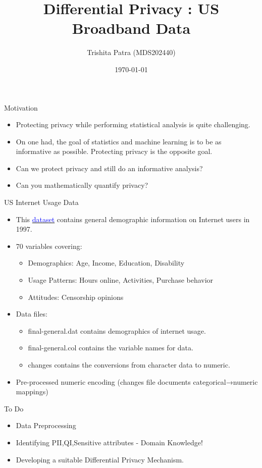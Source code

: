 \documentclass{beamer}
\title{Differential Privacy : US Broadband Data}
\author{Trishita Patra (MDS202440)}
\institute{Chennai Mathematical Institution}
\date{\today}
\begin{document}
\frame{\titlepage}

\begin{frame}{ Motivation}
\begin{itemize}
    \item Protecting privacy while performing statistical analysis is quite challenging. 
    \item On one had, the goal of statistics and machine learning is to be as informative as possible. Protecting privacy is the opposite goal.  
    \item Can we protect privacy and still do an informative analysis?
    \item Can you mathematically quantify privacy?
\end{itemize}
\end{frame}


\begin{frame}{US Internet Usage Data}
\begin{itemize}
    \item This \href{https://archive.ics.uci.edu/dataset/126/internet+usage+data}{\textcolor{blue}{dataset}} contains general demographic information on Internet users in 1997.
    \item 70 variables covering:
    \begin{itemize}
        \item Demographics: Age, Income, Education, Disability
        \item Usage Patterns: Hours online, Activities, Purchase behavior
        \item Attitudes: Censorship opinions
    \end{itemize}
    \item Data files:
    \begin{itemize}
        \item final-general.dat contains demographics of internet usage.
        \item final-general.col contains the variable names for data.
        \item changes contains the conversions from character data to numeric.
    \end{itemize}
    \item Pre-processed numeric encoding (changes file documents categorical→numeric mappings)
\end{itemize}
\end{frame}

\begin{frame}{To Do}
\begin{itemize}
     \item Data Preprocessing 
     \item Identifying PII,QI,Sensitive attributes - Domain Knowledge! 
     \item Developing a suitable Differential Privacy Mechanism.
\end{itemize}
\end{frame}
\end{document}
